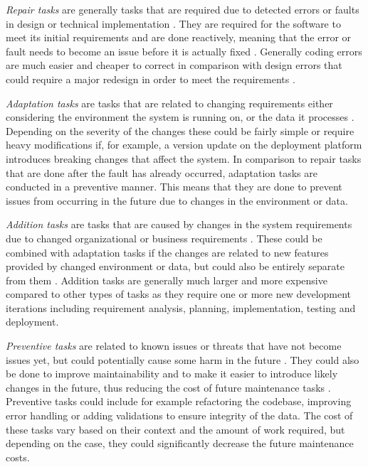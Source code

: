 \emph{Repair tasks} are generally tasks that are required due to detected errors or faults in design or technical implementation \citep{Sommerville2011}. They are required for the software
to meet its initial requirements and are done reactively, meaning that the error or fault needs to become an issue before it is actually fixed \citep{Desharnais2010}. Generally coding errors
are much easier and cheaper to correct in comparison with design errors that could require a major redesign in order to meet the requirements \citep{Sommerville2011}.

\emph{Adaptation tasks} are tasks that are related to changing requirements either considering the environment the system is running on, \citep{Sommerville2011} or the data it processes \citep{Desharnais2010}.
Depending on the severity of the changes these could be fairly simple or require heavy modifications if, for example, a version update
on the deployment platform introduces breaking changes
that affect the system. In comparison to repair tasks that are done after the fault has already occurred,
adaptation tasks are conducted in a preventive manner. This means that they
are done to prevent issues from occurring in the future due to changes in the environment or data.

\emph{Addition tasks} are tasks that are caused by changes in the system requirements due to changed organizational or business requirements \citep{Desharnais2010}\citep{Sommerville2011}.
These could be combined with adaptation tasks if the changes are related to new features provided by changed environment or data, but could also be entirely separate from them \citep{Sommerville2011}.
Addition tasks are generally much larger and more expensive compared to other types of tasks as they require one or more new development iterations including requirement analysis, planning, implementation,
testing and deployment.

\emph{Preventive tasks} are related to known issues or threats that have not become issues yet, but could potentially cause some harm
in the future \citep{Desharnais2010}. They could also be done
to improve maintainability and to make it easier to introduce likely changes in the future, thus reducing
the cost of future maintenance tasks \citep{Sommerville2011}. Preventive tasks could
include for example refactoring the codebase, improving error handling or adding validations to ensure integrity of the data. The cost of these tasks vary based on their context and the amount
of work required, but depending on the case, they could significantly decrease the future maintenance costs.

